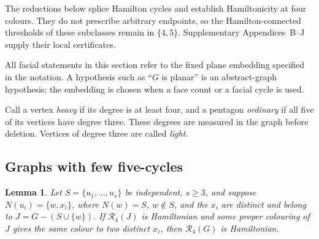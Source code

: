 \documentclass[11pt]{article}
\newtheorem{lemma}[theorem]{Lemma}
\theoremstyle{remark}
\newcommand{\R}{\mathcal R}
\numberwithin{equation}{section}
\numberwithin{table}{section}
\begin{document}
The reductions below splice Hamilton cycles and establish
Hamiltonicity at four colours. They do not prescribe arbitrary
endpoints, so the Hamilton-connected thresholds of these subclasses
remain in $\{4,5\}$. Supplementary Appendices~B--J supply their local
certificates.

All facial statements in this section refer to the fixed plane embedding
specified in the notation.  A hypothesis such as ``$G$ is planar'' is an
abstract-graph hypothesis; the embedding is chosen when a face count or a
facial cycle is used.

Call a vertex \emph{heavy} if its degree is at least four, and a pentagon
\emph{ordinary} if all five of its vertices have degree three. These
degrees are measured in the graph before deletion. Vertices of degree
three are called \emph{light}.

\subsection{Graphs with few five-cycles}
\begin{lemma}
\label{lem:subdivided-star-four-subclass}
Let $S=\{u_1,\ldots,u_s\}$ be independent, $s\ge3$, and suppose
$N(u_i)=\{w,x_i\}$, where $N(w)=S$, $w\notin S$, and the $x_i$ are distinct and belong to
$J=G-(S\cup\{w\})$.  If $\R_4(J)$ is Hamiltonian and some proper colouring
of $J$ gives the same colour to two distinct $x_i$, then $\R_4(G)$ is
Hamiltonian.
\end{lemma}
\end{document}
